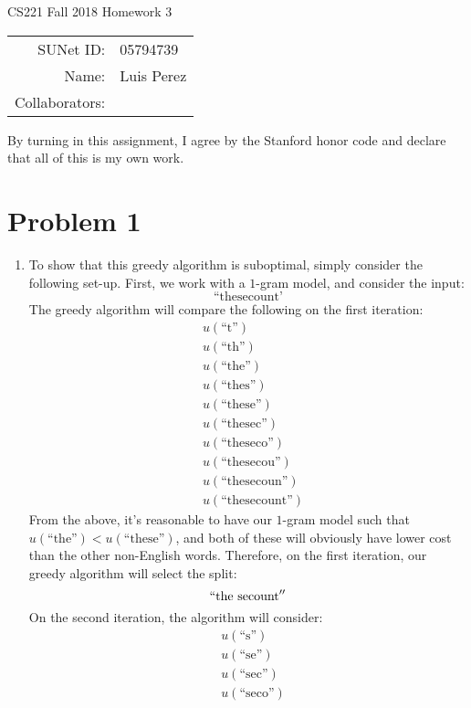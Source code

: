 \documentclass[12pt]{article}
\begin{document}
\begin{center}
{\Large CS221 Fall 2018 Homework 3}

\begin{tabular}{rl}
SUNet ID: & 05794739 \\
Name: & Luis Perez \\
Collaborators: &
\end{tabular}
\end{center}

By turning in this assignment, I agree by the Stanford honor code and declare
that all of this is my own work.

\section*{Problem 1}

\begin{enumerate}[label=(\alph*)]
\item To show that this greedy algorithm is suboptimal, simply consider the following set-up. First, we work with a $1$-gram model, and consider the input:
$$
\text{``thesecount'}
$$
The greedy algorithm will compare the following on the first iteration:
\begin{align*}
  &u(\text{``t''}) \\
  &u(\text{``th''}) \\
  &u(\text{``the''}) \\
  &u(\text{``thes''}) \\
  &u(\text{``these''}) \\
  &u(\text{``thesec''}) \\
  &u(\text{``theseco''}) \\
  &u(\text{``thesecou''}) \\
  &u(\text{``thesecoun''}) \\
  &u(\text{``thesecount''})
\end{align*}
From the above, it's reasonable to have our $1$-gram model such that $u(\text{``the''}) < u(\text{``these''})$, and both of these will obviously have lower cost than the other non-English words. Therefore, on the first iteration, our greedy algorithm will select the split:
$$
  ``\text{the secount}''
$$
On the second iteration, the algorithm will consider:
\begin{align*}
  &u(\text{``s''}) \\
  &u(\text{``se''}) \\
  &u(\text{``sec''}) \\
  &u(\text{``seco''}) \\

\end{align*}
\end{enumerate}
\end{document}

